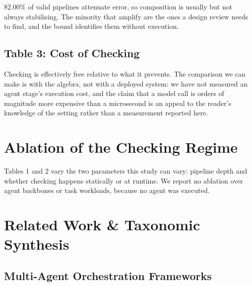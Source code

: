 \documentclass[10pt,twocolumn,letterpaper]{article}
\begin{document}
82.00\% of valid pipelines attenuate error, so composition is usually but not always stabilising. The minority that amplify are the ones a design review needs to find, and the bound identifies them without execution.


\subsection{Table 3: Cost of Checking}
\begin{table}[htbp]
\centering
{}
\end{table}

Checking is effectively free relative to what it prevents. The comparison we can make is with the algebra, not with a deployed system: we have not measured an agent stage's execution cost, and the claim that a model call is orders of magnitude more expensive than a microsecond is an appeal to the reader's knowledge of the setting rather than a measurement reported here.



\section{Ablation of the Checking Regime}


Tables 1 and 2 vary the two parameters this study can vary: pipeline depth and whether checking happens statically or at runtime. We report no ablation over agent backbones or task workloads, because no agent was executed.




\section{Related Work \& Taxonomic Synthesis}



\subsection{Multi-Agent Orchestration Frameworks}
\end{document}
